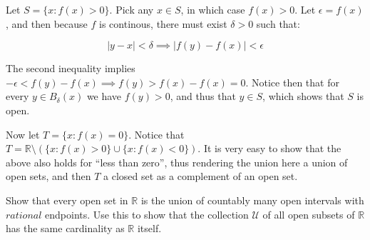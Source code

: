 \begin{solution}
    
    Let $S = \{x: f(x) > 0\}$.
    Pick any $x \in S$, in which case $f(x) > 0$.
    Let $\epsilon = f(x)$, and then because $f$ is continous, there must exist $\delta > 0$ such that:

    $$\lvert y - x \rvert < \delta \implies \lvert f(y) - f(x) \rvert < \epsilon$$

    The second inequality implies $-\epsilon < f(y) - f(x) \implies f(y) > f(x) - f(x) = 0$.
    Notice then that for every $y \in B_{\delta}(x)$ we have $f(y) > 0$, and thus that $y \in S$, which shows that $S$ is open.

    Now let $T = \{x: f(x) = 0\}$.
    Notice that $T = \mathbb{R} \setminus (\{x: f(x) > 0\} \cup \{x: f(x) < 0\})$.
    It is very easy to show that the above also holds for ``less than zero'', thus rendering the union here a union of open sets, and then $T$ a closed set as a complement of an open set.

\end{solution}

\begin{exercise}{7}
    Show that every open set in $\mathbb{R}$ is the union of countably many open intervals with $\textit{rational}$ endpoints.
    Use this to show that the collection $\mathcal{U}$ of all open subsets of $\mathbb{R}$ has the same cardinality as $\mathbb{R}$ itself.
\end{exercise}

